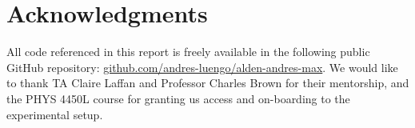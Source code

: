 \documentclass[letter,scriptaddress,twocolumn, prl,showkeys]{revtex4}
\begin{document}
\subsection{}

\section{Acknowledgments}

\begin{acknowledgments}
All code referenced in this report is freely available in the following public GitHub repository: \hyperlink{https://github.com/andres-luengo/alden-andres-max-most-dangerous-4450-trio}{github.com/andres-luengo/alden-andres-max}.
We would like to thank TA Claire Laffan and Professor Charles Brown for their mentorship, and the PHYS 4450L course for granting us access and on-boarding to the experimental setup.
\end{acknowledgments}



\end{document}
